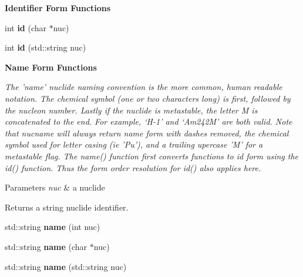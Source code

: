 \begin{Indent}{\bf Identifier Form Functions}
\begin{DoxyCompactItemize}
\item 
\hypertarget{namespacepyne_1_1nucname_abd47ad9bd47f674792742d3e4b115b16}{int {\bfseries id} (char $\ast$nuc)}\label{namespacepyne_1_1nucname_abd47ad9bd47f674792742d3e4b115b16}

\item 
\hypertarget{namespacepyne_1_1nucname_aba028a16fcfaeb10e45bb5218606a17e}{int {\bfseries id} (std\+::string nuc)}\label{namespacepyne_1_1nucname_aba028a16fcfaeb10e45bb5218606a17e}

\end{DoxyCompactItemize}
\end{Indent}
\begin{Indent}{\bf Name Form Functions}\par
{\em The 'name' nuclide naming convention is the more common, human readable notation. The chemical symbol (one or two characters long) is first, followed by the nucleon number. Lastly if the nuclide is metastable, the letter M is concatenated to the end. For example, ‘\+H-\/1’ and ‘\+Am242\+M’ are both valid. Note that nucname will always return name form with dashes removed, the chemical symbol used for letter casing (ie 'Pu'), and a trailing upercase 'M' for a metastable flag. The name() function first converts functions to id form using the id() function. Thus the form order resolution for id() also applies here. 
\begin{DoxyParams}{Parameters}
{\em nuc} & a nuclide \\
\hline
\end{DoxyParams}
\begin{DoxyReturn}{Returns}
a string nuclide identifier. 
\end{DoxyReturn}
}\begin{DoxyCompactItemize}
\item 
\hypertarget{namespacepyne_1_1nucname_a70117a5d74d65b210c635c662e08fe10}{std\+::string {\bfseries name} (int nuc)}\label{namespacepyne_1_1nucname_a70117a5d74d65b210c635c662e08fe10}

\item 
\hypertarget{namespacepyne_1_1nucname_a38fc868c1a343358df2021a151ec03f8}{std\+::string {\bfseries name} (char $\ast$nuc)}\label{namespacepyne_1_1nucname_a38fc868c1a343358df2021a151ec03f8}

\item 
\hypertarget{namespacepyne_1_1nucname_adfcf9a3fc2217ba23e93ce5915bad706}{std\+::string {\bfseries name} (std\+::string nuc)}\label{namespacepyne_1_1nucname_adfcf9a3fc2217ba23e93ce5915bad706}

\end{DoxyCompactItemize}
\end{Indent}
